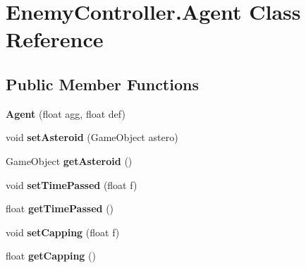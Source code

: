 \hypertarget{class_enemy_controller_1_1_agent}{}\section{Enemy\+Controller.\+Agent Class Reference}
\label{class_enemy_controller_1_1_agent}
\subsection*{Public Member Functions}
\begin{DoxyCompactItemize}
\item 
\hypertarget{class_enemy_controller_1_1_agent_a2be9541303a366a0c46a38df9a8c0200}{}{\bfseries Agent} (float agg, float def)\label{class_enemy_controller_1_1_agent_a2be9541303a366a0c46a38df9a8c0200}

\item 
\hypertarget{class_enemy_controller_1_1_agent_a9a42f29b3793b887b5b9fbb9b7764976}{}void {\bfseries set\+Asteroid} (Game\+Object astero)\label{class_enemy_controller_1_1_agent_a9a42f29b3793b887b5b9fbb9b7764976}

\item 
\hypertarget{class_enemy_controller_1_1_agent_a28475b138ec51dc83ad1abbf6b8d7cc0}{}Game\+Object {\bfseries get\+Asteroid} ()\label{class_enemy_controller_1_1_agent_a28475b138ec51dc83ad1abbf6b8d7cc0}

\item 
\hypertarget{class_enemy_controller_1_1_agent_a0a89319a0e8f1ab5a16781feb601f4f5}{}void {\bfseries set\+Time\+Passed} (float f)\label{class_enemy_controller_1_1_agent_a0a89319a0e8f1ab5a16781feb601f4f5}

\item 
\hypertarget{class_enemy_controller_1_1_agent_a78f5488f282910c7b71db69a94cc3836}{}float {\bfseries get\+Time\+Passed} ()\label{class_enemy_controller_1_1_agent_a78f5488f282910c7b71db69a94cc3836}

\item 
\hypertarget{class_enemy_controller_1_1_agent_a0b09c672b766b14187aacf80caf5af17}{}void {\bfseries set\+Capping} (float f)\label{class_enemy_controller_1_1_agent_a0b09c672b766b14187aacf80caf5af17}

\item 
\hypertarget{class_enemy_controller_1_1_agent_a6359b5e60bd6e61e068a688f419af3d8}{}float {\bfseries get\+Capping} ()\label{class_enemy_controller_1_1_agent_a6359b5e60bd6e61e068a688f419af3d8}


\end{DoxyCompactItemize}
